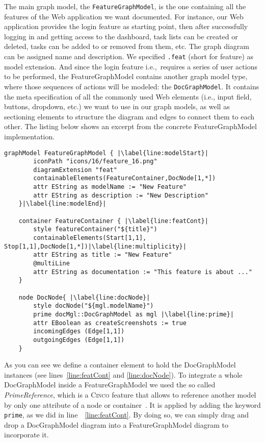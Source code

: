 The main graph model, the \lstinline{FeatureGraphModel}, is the one containing all the features of the Web application we want documented. For instance, our  Web application provides the login feature as starting point, then after successfully logging in and getting access to the dashboard, task lists can be created or deleted, tasks can be added to or removed from them, etc. The graph diagram can be assigned name and description. We specified \lstinline{.feat} (short for feature) as model extension. And since the login feature i.e.,~requires a series of user actions to be performed, the FeatureGraphModel contains another graph model type, where those sequences of actions will be modeled: the \lstinline{DocGraphModel}. It contains the meta specification of all the commonly used Web elements (i.e., input field, buttons, dropdown, etc.) we want to use in our graph models, as well as sectioning elements to structure the diagram and edges to connect them to each other. The listing below shows an excerpt from the concrete FeatureGraphModel implementation.

\begin{lstlisting}[language=MGL, caption={Excerpt from the feature.mgl, meta-specification of the FeatureGraphModel}, label=docMGL, escapechar=|]
    graphModel FeatureGraphModel { |\label{line:modelStart}|
        iconPath "icons/16/feature_16.png"
        diagramExtension "feat"
        containableElements(FeatureContainer,DocNode[1,*])
        attr EString as modelName := "New Feature"
        attr EString as description := "New Description"
    }|\label{line:modelEnd}|
    
    container FeatureContainer { |\label{line:featCont}|
        style featureContainer("${title}")
        containableElements(Start[1,1], Stop[1,1],DocNode[1,*])|\label{line:multiplicity}|
        attr EString as title := "New Feature"
        @multiLine
        attr EString as documentation := "This feature is about ..."
    }
    
    node DocNode{ |\label{line:docNode}|
        style docNode("${mgl.modelName}")
        prime docMgl::DocGraphModel as mgl |\label{line:prime}|
        attr EBoolean as createScreenshots := true
        incomingEdges (Edge[1,1])
        outgoingEdges (Edge[1,1])
    }
\end{lstlisting}

As you can see we define a container element to hold the DocGraphModel instances (see lines~\ref{line:featCont} and \ref{line:docNode}). To integrate a whole DocGraphModel inside a FeatureGraphModel we used the so called \textit{PrimeReference}, which is a \textsc{Cinco} feature that allows to reference another model by only one attribute of a node or container~\cite{Cinco}. It is applied by adding the keyword \lstinline[language=MGL]{prime}, as we did in line~~\ref{line:featCont}. By doing so, we can simply drag and drop a DocGraphModel diagram into a FeatureGraphModel diagram to incorporate it.


